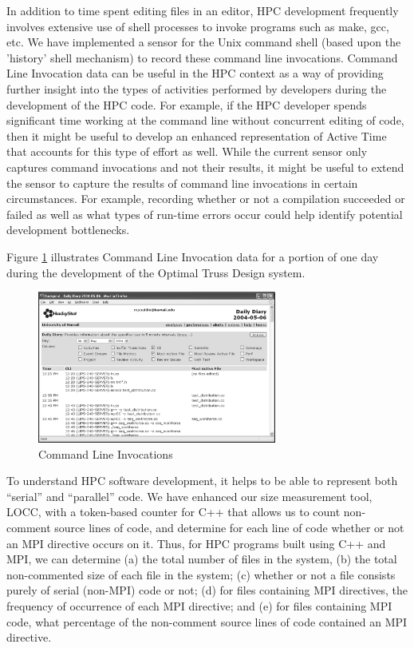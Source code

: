 \documentclass[times,10pt,twocolumn]{article}
\begin{document}

In addition to time spent editing files in an editor, HPC development
frequently involves extensive use of shell processes to invoke programs
such as make, gcc, etc.  We have implemented a sensor for the Unix command
shell (based upon the 'history' shell mechanism) to record these command
line invocations. Command Line Invocation data can be useful in the HPC
context as a way of providing further insight into the types of activities
performed by developers during the development of the HPC code.  For
example, if the HPC developer spends significant time working at the
command line without concurrent editing of code, then it might be useful to
develop an enhanced representation of Active Time that accounts for this
type of effort as well. While the current sensor only captures command
invocations and not their results, it might be useful to extend the sensor
to capture the results of command line invocations in certain
circumstances. For example, recording whether or not a compilation
succeeded or failed as well as what types of run-time errors occur could
help identify potential development bottlenecks.

Figure \ref{fig:commandlineinvocations} illustrates Command Line Invocation data for 
a portion of one day during the  development of the Optimal Truss Design system.

\begin{figure}[htpb]
  \centering
  \includegraphics[width=0.70\textwidth]{truss.commandlineinvocations.eps}
  \caption{Command Line Invocations}
  \label{fig:commandlineinvocations}
\end{figure}


To understand HPC software development, it helps to be able to represent
both ``serial'' and ``parallel'' code.  We have enhanced our size
measurement tool, LOCC, with a token-based counter for C++ that allows us
to count non-comment source lines of code, and determine for each line of
code whether or not an MPI directive occurs on it.  Thus, for HPC programs
built using C++ and MPI, we can determine (a) the total number of files in
the system, (b) the total non-commented size of each file in the system;
(c) whether or not a file consists purely of serial (non-MPI) code or not;
(d) for files containing MPI directives, the frequency of occurrence of
each MPI directive; and (e) for files containing MPI code, what percentage
of the non-comment source lines of code contained an MPI directive.
\end{document}
